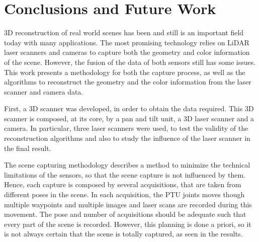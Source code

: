 \chapter{Conclusions and Future Work}
\label{section:conclusions-and-future-work}

\label{Conclusions}
\label{section:conclusions}

3D reconstruction of real world scenes has been and still is an important field today with many applications. The most promising technology relies on LiDAR laser scanners and cameras to capture both the geometry and color information of the scene. However, the fusion of the data of both sensors still has some issues. This work presents a methodology for both the capture process, as well as the algorithms to reconstruct the geometry and the color information from the laser scanner and camera data. 

First, a 3D scanner was developed, in order to obtain the data required. This 3D scanner is composed, at its core, by a pan and tilt unit, a 3D laser scanner and a camera. In particular, three laser scanners were used, to test the validity of the reconstruction algorithms and also to study the influence of the laser scanner in the final result.

The scene capturing methodology describes a method to minimize the technical limitations of the sensors, so that the scene capture is not influenced by them. Hence, each capture is composed by several acquisitions, that are taken from different poses in the scene. In each acquisition, the PTU joints moves though multiple waypoints and multiple images and laser scans are recorded during this movement. The pose and number of acquisitions should be adequate such that every part of the scene is recorded. However, this planning is done a priori, so it is not always certain that the scene is totally captured, as seen in the results.

